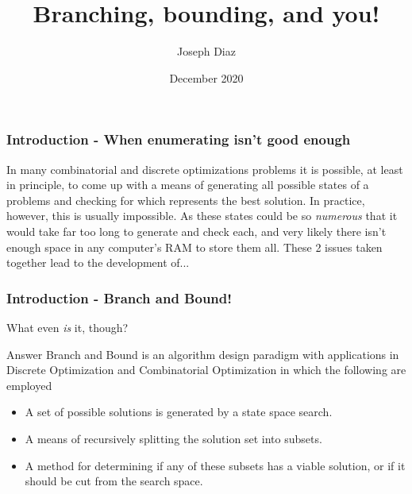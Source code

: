 \documentclass{beamer}
\title{Branching, bounding, and you!}
\author{Joseph Diaz}
\institute{San Diego State University}
\date{December 2020}
\begin{document}
\frame{\titlepage}

\begin{frame}
\frametitle{Introduction - When enumerating isn't good enough}
In many combinatorial and discrete optimizations problems it is possible, at least in principle,
to come up with a means of generating all possible states of a problems and checking for
which represents the best solution. \vfill
In practice, however, this is usually impossible. As these states could be so 
\textit{numerous} that it would take far too long to generate and check each, and very likely 
there isn't enough space in any computer's RAM to store them all.\vfill
These 2 issues taken together lead to the development of...
\end{frame}

\begin{frame}
\frametitle{Introduction - Branch and Bound!}
What even \textit{is} it, though?
\begin{block}{Answer}
Branch and Bound is an algorithm design paradigm with applications in Discrete Optimization and
Combinatorial Optimization in which the following are employed
\begin{itemize}
    \item A set of possible solutions is generated by a state space search.
    \item A means of recursively splitting the solution set into subsets.
    \item A method for determining if any of these subsets has a viable solution, or if it 
    should be cut from the search space. 
\end{itemize}
\end{block}
\end{frame}
\end{document}

